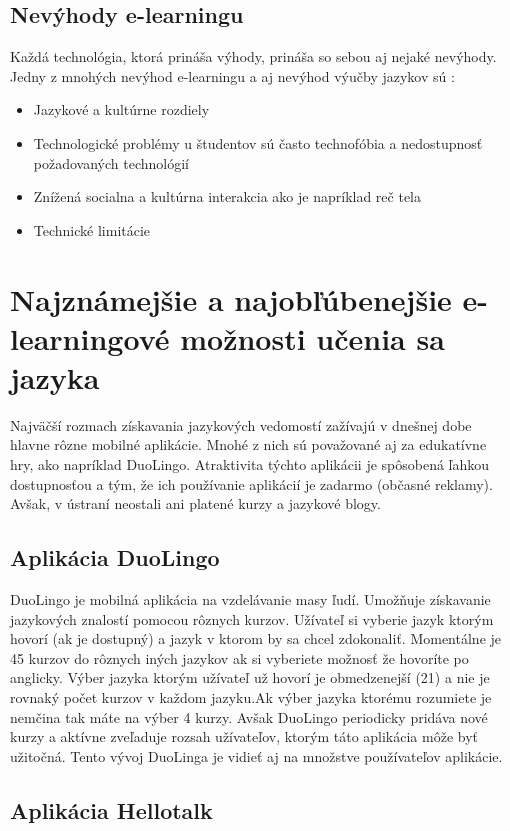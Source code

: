 \documentclass[10pt,twoside,slovak,a4paper]{article}
\begin{document}
\subsection{Nevýhody e-learningu}%
Každá technológia, ktorá prináša výhody, prináša so sebou aj nejaké nevýhody. Jedny z mnohých nevýhod e-learningu a aj nevýhod výučby jazykov sú :\\
\begin{itemize}
\item Jazykové a kultúrne rozdiely \cite{efektivnost}
\item Technologické problémy u študentov sú často technofóbia a nedostupnosť požadovaných technológií \cite{nevyhody}
\item Znížená socialna a kultúrna interakcia ako je napríklad reč tela \cite{nevyhody}
\item Technické limitácie\cite{efektivnost}
\end{itemize}

\section{Najznámejšie a najobľúbenejšie e-learningové možnosti učenia sa jazyka}%
Najväčší rozmach získavania jazykových vedomostí zažívajú v dnešnej dobe hlavne rôzne mobilné aplikácie. Mnohé z nich sú považované aj za edukatívne hry, ako napríklad DuoLingo. Atraktivita týchto aplikácii je spôsobená ľahkou dostupnosťou a tým, že ich používanie aplikácií je zadarmo (občasné reklamy). Avšak, v ústraní neostali ani platené kurzy a jazykové blogy.

\subsection{Aplikácia DuoLingo}%
DuoLingo je mobilná aplikácia na vzdelávanie masy ľudí. Umožňuje získavanie jazykových znalostí pomocou rôznych kurzov. Užívateľ si vyberie jazyk ktorým hovorí (ak je dostupný) a jazyk v ktorom by sa chcel zdokonaliť. Momentálne je 45 kurzov do rôznych iných jazykov ak si vyberiete možnosť že hovoríte po anglicky. Výber jazyka ktorým užívateľ už hovorí je obmedzenejší (21) a nie je rovnaký počet kurzov v každom jazyku.Ak výber jazyka ktorému rozumiete je nemčina tak máte na výber 4 kurzy. Avšak DuoLingo periodicky pridáva nové kurzy a aktívne zveľaduje rozsah užívateľov, ktorým táto aplikácia môže byť užitočná. Tento vývoj DuoLinga je vidieť aj na množstve používateľov aplikácie.

\subsection{Aplikácia Hellotalk}
\end{document}
